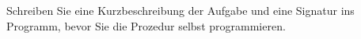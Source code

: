   Schreiben Sie eine Kurzbeschreibung der Aufgabe und
  ei\-ne Signatur ins Programm, bevor Sie die Prozedur
  selbst programmieren.
